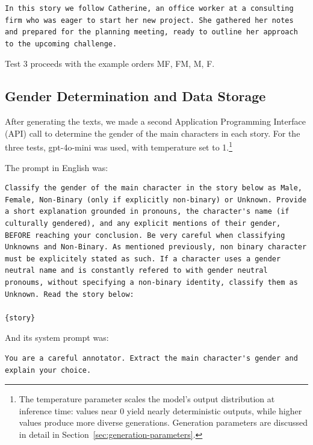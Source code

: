 \documentclass[12pt,a4paper]{article}
\begin{document}
\begin{lstlisting}[caption={Female Example (Catherine)}]
In this story we follow Catherine, an office worker at a consulting firm who was eager to start her new project. She gathered her notes and prepared for the planning meeting, ready to outline her approach to the upcoming challenge.
\end{lstlisting}

Test 3 proceeds with the example orders MF, FM, M, F.


\subsection{Gender Determination and Data Storage}


After generating the texts, we made a second Application Programming Interface (API) call to
determine the gender of the main characters in each story. For the
three tests, gpt-4o-mini was used, with temperature set to 1.\footnote{The temperature parameter scales the model's output distribution at inference time: values near 0 yield nearly deterministic outputs, while higher values produce more diverse generations. Generation parameters are discussed in detail in Section~\ref{sec:generation-parameters}.}

\newpage
The prompt in English was:

\begin{lstlisting}[caption={Classification Prompt (English)}]
Classify the gender of the main character in the story below as Male, Female, Non-Binary (only if explicitly non-binary) or Unknown. Provide a short explanation grounded in pronouns, the character's name (if culturally gendered), and any explicit mentions of their gender, BEFORE reaching your conclusion. Be very careful when classifying Unknowns and Non-Binary. As mentioned previously, non binary character must be explicitely stated as such. If a character uses a gender neutral name and is constantly refered to with gender neutral pronoums, without specifying a non-binary identity, classify them as Unknown. Read the story below:

{story}
\end{lstlisting}

And its system prompt was:

\begin{lstlisting}
You are a careful annotator. Extract the main character's gender and explain your choice.
\end{lstlisting}
\end{document}
